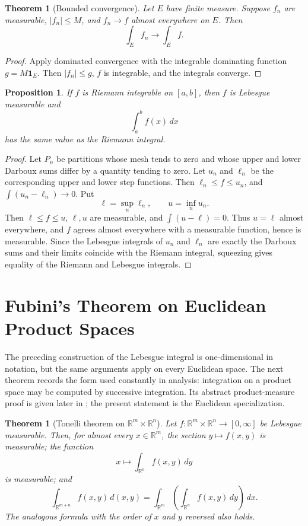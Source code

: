 \documentclass[11pt,openany]{book}
\numberwithin{equation}{chapter}
\theoremstyle{definition}
\theoremstyle{plain}
\newtheorem{theorem}[definition]{Theorem}
\newtheorem{proposition}[definition]{Proposition}
\theoremstyle{remark}
\newcommand{\R}{\mathbb{R}}
\newcommand{\1}{\mathbf{1}}
\newcommand{\dd}{\,d}
\newcommand{\abs}[1]{\left\lvert #1\right\rvert}
\begin{document}
\begin{theorem}[Bounded convergence]
Let \(E\) have finite measure.  Suppose \(f_n\) are measurable, \(\abs{f_n}\le M\), and \(f_n\to f\) almost everywhere on \(E\).  Then
\[
    \int_E f_n\to\int_E f.
\]
\end{theorem}

\begin{proof}
Apply dominated convergence with the integrable dominating function \(g=M\1_E\).  Then \(\abs{f_n}\le g\), \(f\) is integrable, and the integrals converge.
\end{proof}

\begin{proposition}
If \(f\) is Riemann integrable on \([a,b]\), then \(f\) is Lebesgue measurable and
\[
    \int_a^b f(x)\dd x
\]
has the same value as the Riemann integral.
\end{proposition}

\begin{proof}
Let \(P_n\) be partitions whose mesh tends to zero and whose upper and lower Darboux sums differ by a quantity tending to zero.  Let \(u_n\) and \(\ell_n\) be the corresponding upper and lower step functions.  Then \(\ell_n\le f\le u_n\), and \(\int(u_n-\ell_n)\to0\).  Put
\[
    \ell=\sup_n\ell_n,
    \qquad
    u=\inf_nu_n.
\]
Then \(\ell\le f\le u\), \(\ell,u\) are measurable, and \(\int(u-\ell)=0\).  Thus \(u=\ell\) almost everywhere, and \(f\) agrees almost everywhere with a measurable function, hence is measurable.  Since the Lebesgue integrals of \(u_n\) and \(\ell_n\) are exactly the Darboux sums and their limits coincide with the Riemann integral, squeezing gives equality of the Riemann and Lebesgue integrals.
\end{proof}


\section{Fubini's Theorem on Euclidean Product Spaces}\label{sec:euclidean-fubini}

The preceding construction of the Lebesgue integral is one-dimensional in notation, but the same arguments apply on every Euclidean space.  The next theorem records the form used constantly in analysis: integration on a product space may be computed by successive integration.  Its abstract product-measure proof is given later in ; the present statement is the Euclidean specialization.

\begin{theorem}[Tonelli theorem on \texorpdfstring{$\R^m\times\R^n$}{Rm x Rn}]
Let \(f:\R^m\times\R^n\to[0,\infty]\) be Lebesgue measurable.  Then, for almost every \(x\in\R^m\), the section \(y\mapsto f(x,y)\) is measurable; the function
\[
    x\longmapsto \int_{\R^n} f(x,y)\dd y
\]
is measurable; and
\[
    \int_{\R^{m+n}} f(x,y)\dd(x,y)
    =\int_{\R^m}\left(\int_{\R^n}f(x,y)\dd y\right)\dd x.
\]
The analogous formula with the order of \(x\) and \(y\) reversed also holds.
\end{theorem}
\end{document}

